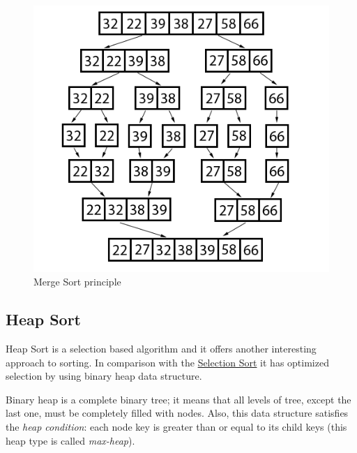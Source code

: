 \documentclass[
  field=inf,
  biblatex,
  language=english,
  glossaries,
  theorems=false,
  sourcecodes=false,
  index
]{kidiplom}
\begin{document}
\begin{figure}[H]
\begin{center}
	
	\includegraphics[scale=2.5]{img/Mergesort.png}
	\caption{Merge Sort principle}\label{fig:insert}
\end{center}
\end{figure}

\subsection{Heap Sort}
\label{sec:heapsort}

Heap Sort is a selection based algorithm and it offers another interesting approach to sorting. In comparison with the \hyperref[sec:selection]{Selection Sort} it has optimized selection by using binary heap data structure.

Binary heap is a complete binary tree; it means that all levels of tree, except the last one, must be completely filled with nodes. Also, this data structure satisfies the \textit{heap condition}: each node key is greater than or equal to its child keys (this heap type is called \textit{max-heap}).
\end{document}
